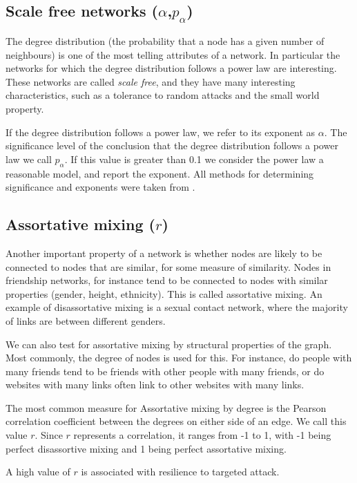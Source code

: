 \documentclass{article}
\theoremstyle{definition}
\begin{document}
\subsection*{Scale free networks ($\alpha$,$p_\alpha$)}

The degree distribution (the probability that a node has a given number of neighbours) is one of the most telling attributes of a network. In particular the networks for which the degree distribution follows a power law are interesting. These networks are called \emph{scale free}, and they have many  interesting characteristics, such as a tolerance to random attacks and the small world property. \cite{barabasi1999emergence}

If the degree distribution follows a power law, we refer to its exponent as $\alpha$.
The significance level of the conclusion that the degree distribution follows a power law we call $p_\alpha$. If this value is greater than 0.1 we consider the power law a reasonable model, and report the exponent. All methods for determining significance and exponents were taken from \cite{clauset2007power}.

\subsection*{Assortative mixing ($r$)}

Another important property of a network is whether nodes are likely to be connected to nodes that are similar, for some measure of similarity. Nodes in friendship networks, for instance tend to be connected to nodes with similar properties (gender, height, ethnicity). This is called assortative mixing. An example of disassortative mixing is a sexual contact network, where the majority of links are between different genders.

We can also test for assortative mixing by structural properties of the graph. Most commonly, the degree of nodes is used for this. For instance, do people with many friends tend to be friends with other people with many friends, or do websites with many links often link to other websites with many links.

The most common measure for Assortative mixing by degree is the Pearson correlation coefficient between the degrees on either side of an edge. We call this value $r$. Since $r$ represents a correlation, it ranges from -1 to 1, with -1 being perfect disassortive mixing and 1 being perfect assortative mixing. 

A high value of $r$ is associated with resilience to targeted attack.
\end{document}
